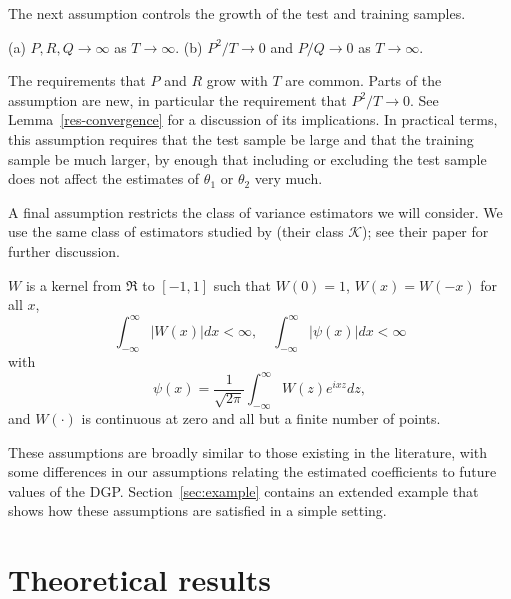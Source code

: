 \documentclass[12pt]{article}
\begin{document}
The next assumption controls the growth of the test and
training samples.
\begin{asmp} \label{asmp-4} (a) $P, R, Q \to\infty$ as $T \to
  \infty$. (b) $P^2/T \to 0$ and $P/Q \to 0$ as $T \to \infty$.
\end{asmp}

The requirements that $P$ and $R$ grow with $T$ are common. Parts of
the assumption are new, in particular the requirement that $P^2/T \to
0$.  See Lemma~\ref{res-convergence} for a discussion of its
implications.  In practical terms, this assumption requires that the
test sample be large and that the training sample be much larger, by
enough that including or excluding the test sample does not affect the
estimates of $\theta_1$ or $\theta_2$ very much.

A final assumption restricts the class of variance estimators we will
consider.  We use the same class of estimators studied by
\citet{JoD:00} (their class $\mathcal{K}$); see
their paper for further discussion.

\begin{asmp}
  \label{asmp-5} $W$ is a kernel from
$\Re$ to $[-1,1]$ such that $W(0) = 1$, $W(x) = W(-x)$ for all $x$,
\begin{equation}
  \int_{-\infty}^{\infty} \lvert W(x) \rvert dx < \infty, \quad
  \int_{-\infty}^{\infty} \lvert \psi(x) \rvert dx < \infty
\end{equation}
with
\begin{equation}
  \psi(x) = \frac1{\sqrt{2\pi}} \int_{-\infty}^{\infty} W(z) e^{ixz}dz,
\end{equation}
and $W(\cdot)$ is continuous at zero and all but a finite number of
points.
\end{asmp}

These assumptions are broadly similar to those existing in the
literature, with some differences in our assumptions relating the
estimated coefficients to future values of the DGP.
Section~\ref{sec:example} contains an extended example that shows how
these assumptions are satisfied in a simple setting.

\section{Theoretical results}
\label{sec:theory}
\end{document}
